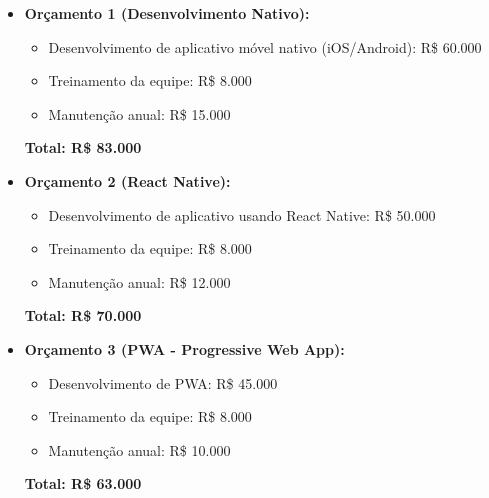 \begin{itemize}
		\begin{itemize}
			\item \textbf{Orçamento 1 (Desenvolvimento Nativo):}
			\begin{itemize}
				\item Desenvolvimento de aplicativo móvel nativo (iOS/Android): R\$ 60.000
				\item Treinamento da equipe: R\$ 8.000
				\item Manutenção anual: R\$ 15.000
			\end{itemize}
			
			\textbf{Total: R\$ 83.000}
			
			\item \textbf{Orçamento 2 (React Native):}
			\begin{itemize}
				\item Desenvolvimento de aplicativo usando React Native: R\$ 50.000
				\item Treinamento da equipe: R\$ 8.000
				\item Manutenção anual: R\$ 12.000
			\end{itemize}
			
			\textbf{Total: R\$ 70.000}
			
			\item \textbf{Orçamento 3 (PWA - Progressive Web App):}
			\begin{itemize}
				\item Desenvolvimento de PWA: R\$ 45.000
				\item Treinamento da equipe: R\$ 8.000
				\item Manutenção anual: R\$ 10.000
			\end{itemize}
			
			\textbf{Total: R\$ 63.000}
		\end{itemize}
\end{itemize}
		


